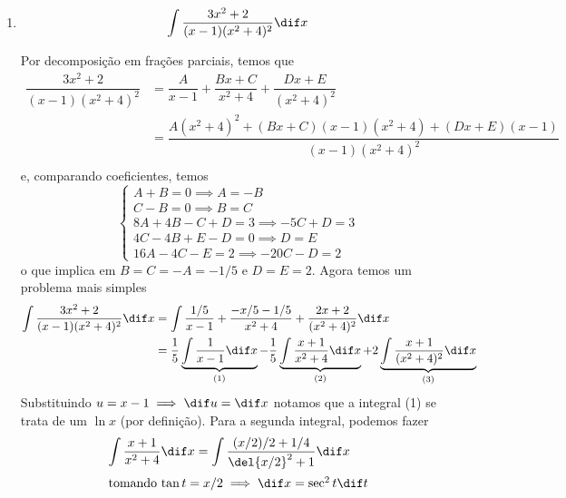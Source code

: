 \documentclass{IMTexam}
\begin{document}
\begin{questions}
        \begin{enumerate}[label=(\roman*)]
            \item \[ \int \dfrac{3x^2+2}{(x-1)(x^2+4)^2}\dif x \]
            \begin{solution}
                Por decomposição em frações parciais, temos que
                \begin{align*}
                    \dfrac{3x^2+2}{(x-1)(x^2+4)^2} &=
                    \dfrac{A}{x-1}+\dfrac{Bx+C}{x^2+4}+\dfrac{Dx+E}{(x^2+4)^2}\\
                    &=\dfrac{A(x^2+4)^2+(Bx+C)(x-1)(x^2+4)+(Dx+E)(x-1)}{(x-1)(x^2+4)^2}\\
                \end{align*}
                e, comparando coeficientes, temos
                \[ \begin{cases}
                    A+B=0\implies A=-B\\
                    C-B=0\implies B=C\\
                    8A+4B-C+D=3\implies -5C+D=3\\
                    4C-4B+E-D=0\implies D=E\\
                    16A-4C-E=2\implies -20C-D=2
                \end{cases} \]
                o que implica em $ B=C=-A=-1/5 $ e $ D=E=2 $.
                Agora temos um problema mais simples
                \begin{align*}
                    \int \dfrac{3x^2+2}{(x-1)(x^2+4)^2}\dif
                    x&=\int\dfrac{1/5}{x-1}+\dfrac{-x/5-1/5}{x^2+4}+\dfrac{2x+2}{(x^2+4)^2}\dif
                    x\\
                    &=\dfrac{1}{5}\underbrace{\int\dfrac{1}{x-1}\dif
                    x}_{(1)}-\dfrac{1}{5}\underbrace{\int\dfrac{x+1}{x^2+4}\dif
                    x}_{(2)}+2\underbrace{\int\dfrac{x+1}{(x^2+4)^2}\dif
                    x}_{(3)}
                \end{align*}
                Substituindo $ u = x-1 \implies \dif u = \dif x $
                notamos que a integral (1) se trata de um $ \ln x $ (por definição).
                Para a segunda integral, podemos fazer
                \begin{align*}
                    \int \dfrac{x+1}{x^2+4}\dif x&=\int \dfrac{(x/2)/2+1/4}{\del{x/2}^2+1}\dif x\\
                    \intertext{tomando $\tan t = x/2 \implies \dif x = \sec^2 t \dif t$}

\end{align*}
\end{solution}
\end{enumerate}
\end{questions}
\end{document}
